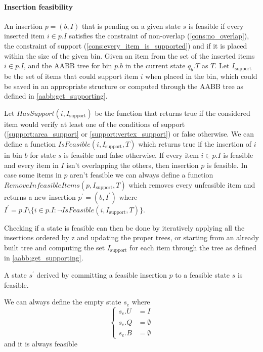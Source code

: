 

\paragraph*{Insertion feasibility}
An insertion $p = (b, I)$ that is pending on a given state $s$ is feasible if every inserted item $i \in p.I$ satisfies the constraint of non-overlap (\ref{cons:no_overlap}), the constraint of support (\ref{cons:every_item_is_supported}) and if it is placed within the size of the given bin.
Given an item from the set of the inserted items $i \in p.I$, and the AABB tree for bin $p.b$ in the current state $q_b.T$ as $T$.
Let $I_{\text{support}}$ be the set of items that could support item $i$ when placed in the bin, which could be saved in an appropriate structure or computed through the AABB tree as defined in \cref{aabb:get_supporting}.

Let $HasSupport(i, I_{\text{support}})$ be the function that returns true if the considered item would verify at least one of the conditions of support (\ref{support:area_support} or \ref{support:vertex_support}) or false otherwise.
We can define a function $IsFeasible(i, I_{\text{support}}, T)$ which returns true if the insertion of $i$ in bin $b$ for state $s$ is feasible and false otherwise. 
If every item $i \in p.I$ is feasible and every item in $I$ isn't overlapping the others, then insertion $p$ is feasible.
In case some items in $p$ aren't feasible we can always define a function $RemoveInfeasibleItems(p, I_{\text{support}}, T)$ which removes every unfeasible item and returns a new insertion $p^\prime = (b, I^\prime)$ where $I^\prime = p.I \setminus \{i \in p.I : \lnot IsFeasible(i, I_{\text{support}}, T)\}$. \label{algo:remove_infeasible}

Checking if a state is feasible can then be done by iteratively applying all the insertions ordered by z and updating the proper trees, or starting from an already built tree and computing the set $I_{\text{support}}$ for each item through the tree as defined in \ref{aabb:get_supporting}.
\begin{proposition}
    \label{prop:feasible_expansion}
    A state $s^\prime$ derived by committing a feasible insertion $p$ to a feasible state $s$ is feasible.
\end{proposition}

\begin{observation}
    \label{def:empty_state}
    We can always define the empty state $s_e$ where \begin{equation*}
        \left\{ 
            \begin{aligned}
            s_e.U & = I \\
            s_e.Q & = \emptyset \\
            s_e.B & = \emptyset
            \end{aligned}
        \right.
    \end{equation*}
    and it is always feasible
\end{observation}

